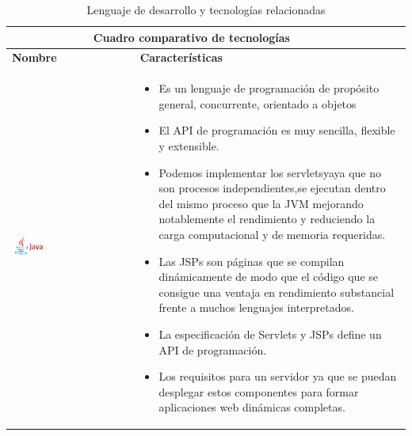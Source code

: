 \newpage
\begin{table}[b!]
    \centering
    \vspace{-30mm}
      \begin{tabular}{|p{2cm}|ll}
        \hline
        \multicolumn{2}{|c|}{{\bf Cuadro comparativo de tecnologías}} \\ 
        \hline
          \multicolumn{1}{|p{4cm}|}{{\bf Nombre}} & 
		  \multicolumn{1}{p{10cm}|}{{\bf Características}}\\
        \hline
          \multicolumn{1}{|p{5cm}|}{\includegraphics[width=0.3\textwidth]{images/java}} & 
          \multicolumn{2}{p{10cm}|}{\begin{itemize}
          \vspace{-25mm}
        \item Es un lenguaje de programación de propósito general, concurrente, orientado a objetos 
        \item El API de programación es muy sencilla, flexible y extensible.
        \item Podemos implementar los servletsyaya que no son procesos independientes,se ejecutan dentro del mismo proceso que la JVM mejorando notablemente el rendimiento y reduciendo la carga computacional y de memoria requeridas.
		\item Las JSPs son páginas que se compilan dinámicamente de modo que el código que se consigue una ventaja en rendimiento substancial frente a muchos lenguajes interpretados.
         \item La especificación de Servlets y JSPs define un API de programación.
         \item Los requisitos para un servidor ya que se puedan desplegar estos componentes para formar aplicaciones web dinámicas completas. \cite{40}
      \end{itemize}} \\
        \hline
      \end{tabular}
      \caption{Lenguaje de desarrollo y tecnologías relacionadas}
      \label{table: Lenguaje de desarrollo}
    \end{table}

